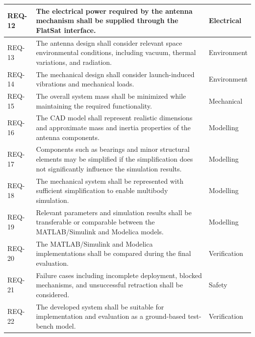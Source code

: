 \begin{table}[H]
\begin{tabularx}{\textwidth}{|l|X|l|}
		REQ-12 &
		The electrical power required by the antenna mechanism shall be
		supplied through the FlatSat interface. &
		Electrical \\
		\hline
		
		REQ-13 &
		The antenna design shall consider relevant space environmental
		conditions, including vacuum, thermal variations, and radiation. &
		Environment \\
		\hline
		
		REQ-14 &
		The mechanical design shall consider launch-induced vibrations and
		mechanical loads. &
		Environment \\
		\hline
		
		REQ-15 &
		The overall system mass shall be minimized while maintaining the
		required functionality. &
		Mechanical \\
		\hline
		
		REQ-16 &
		The CAD model shall represent realistic dimensions and approximate
		mass and inertia properties of the antenna components. &
		Modelling \\
		\hline
		
		REQ-17 &
		Components such as bearings and minor structural elements may be
		simplified if the simplification does not significantly influence
		the simulation results. &
		Modelling \\
		\hline
		
		REQ-18 &
		The mechanical system shall be represented with sufficient
		simplification to enable multibody simulation. &
		Modelling \\
		\hline
		
		REQ-19 &
		Relevant parameters and simulation results shall be transferable or
		comparable between the MATLAB/Simulink and Modelica models. &
		Modelling \\
		\hline
		
		REQ-20 &
		The MATLAB/Simulink and Modelica implementations shall be compared
		during the final evaluation. &
		Verification \\
		\hline
		
		REQ-21 &
		Failure cases including incomplete deployment, blocked mechanisms,
		and unsuccessful retraction shall be considered. &
		Safety \\
		\hline
		
		REQ-22 &
		The developed system shall be suitable for implementation and
		evaluation as a ground-based test-bench model. &
		Verification \\
		\hline
	\end{tabularx}
\end{table}


